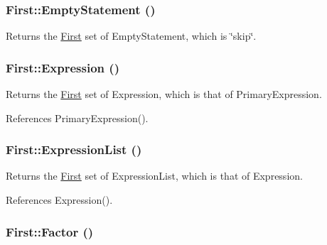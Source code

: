 \hypertarget{classFirst_a0b4acc2ad6d1f2f8f8d3b1ec984431bf}{
\subsubsection[{EmptyStatement}]{ First::EmptyStatement ()}}
\label{classFirst_a0b4acc2ad6d1f2f8f8d3b1ec984431bf}


Returns the \hyperlink{classFirst}{First} set of EmptyStatement, which is \char`\"{}skip\char`\"{}. 

\hypertarget{classFirst_a151428da8e728244184a256f94c16fd2}{
\subsubsection[{Expression}]{ First::Expression ()}}
\label{classFirst_a151428da8e728244184a256f94c16fd2}


Returns the \hyperlink{classFirst}{First} set of Expression, which is that of PrimaryExpression. 



References PrimaryExpression().

\hypertarget{classFirst_af4783dc02b3360e5f1f3576aa241bc0e}{
\subsubsection[{ExpressionList}]{ First::ExpressionList ()}}
\label{classFirst_af4783dc02b3360e5f1f3576aa241bc0e}


Returns the \hyperlink{classFirst}{First} set of ExpressionList, which is that of Expression. 



References Expression().

\hypertarget{classFirst_ad4b339bc0b44402c2fac146afd4adeeb}{
\subsubsection[{Factor}]{ First::Factor ()}}
\label{classFirst_ad4b339bc0b44402c2fac146afd4adeeb}


